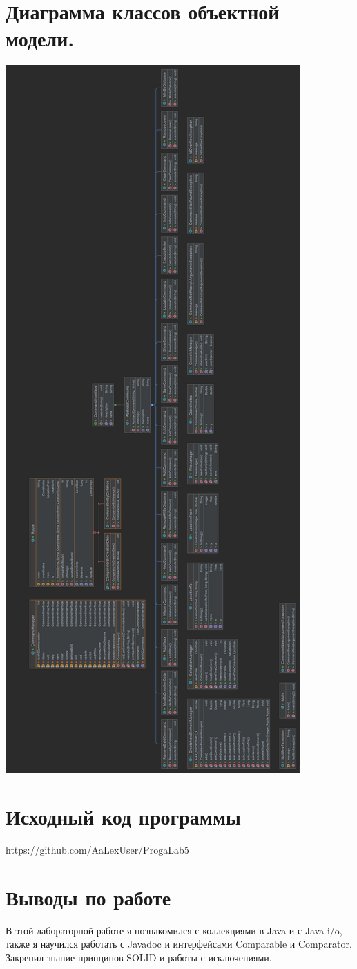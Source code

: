 \documentclass[12pt,onecolumn]{article}
\begin{document}
\section{Диаграмма классов объектной модели.}
\includegraphics[scale=0.1]{UML.png}
\section{Исходный код программы}
https://github.com/AaLexUser/ProgaLab5
\section{Выводы по работе}

В этой лабораторной работе я познакомился с коллекциями в Java и с Java i/o, 
также я научился работать с Javadoc и интерфейсами Comparable и Comparator. Закрепил знание принципов SOLID и работы с исключениями.
\end{document}
